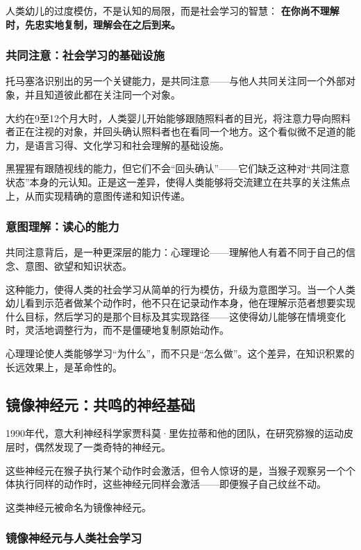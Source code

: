 \documentclass[11pt]{article}
\begin{document}
人类幼儿的过度模仿，不是认知的局限，而是社会学习的智慧： \textbf{在你尚不理解时，先忠实地复制，理解会在之后到来。}
\subsubsection{共同注意：社会学习的基础设施}
\label{sec:org95cf501}

托马塞洛识别出的另一个关键能力，是共同注意——与他人共同关注同一个外部对象，并且知道彼此都在关注同一个对象。

大约在9至12个月大时，人类婴儿开始能够跟随照料者的目光，将注意力导向照料者正在注视的对象，并回头确认照料者也在看同一个地方。这个看似微不足道的能力，是语言习得、文化学习和社会理解的基础设施。

黑猩猩有跟随视线的能力，但它们不会“回头确认”——它们缺乏这种对“共同注意状态”本身的元认知。正是这一差异，使得人类能够将交流建立在共享的关注焦点上，从而实现精确的意图传递和知识传递。
\subsubsection{意图理解：读心的能力}
\label{sec:orgf6f1f5a}

共同注意背后，是一种更深层的能力：心理理论——理解他人有着不同于自己的信念、意图、欲望和知识状态。

这种能力，使得人类的社会学习从简单的行为模仿，升级为意图学习。当一个人类幼儿看到示范者做某个动作时，他不只在记录动作本身，他在理解示范者想要实现什么目标，然后学习的是那个目标及其实现路径——这使得幼儿能够在情境变化时，灵活地调整行为，而不是僵硬地复制原始动作。

心理理论使人类能够学习“为什么”，而不只是“怎么做”。这个差异，在知识积累的长远效果上，是革命性的。
\subsection{镜像神经元：共鸣的神经基础}
\label{sec:org4ab8154}

1990年代，意大利神经科学家贾科莫·里佐拉蒂和他的团队，在研究猕猴的运动皮层时，偶然发现了一类奇特的神经元。

这些神经元在猴子执行某个动作时会激活，但令人惊讶的是，当猴子观察另一个个体执行同样的动作时，这些神经元同样会激活——即便猴子自己纹丝不动。

这类神经元被命名为镜像神经元。
\subsubsection{镜像神经元与人类社会学习}
\label{sec:orgde1db86}
\end{document}
